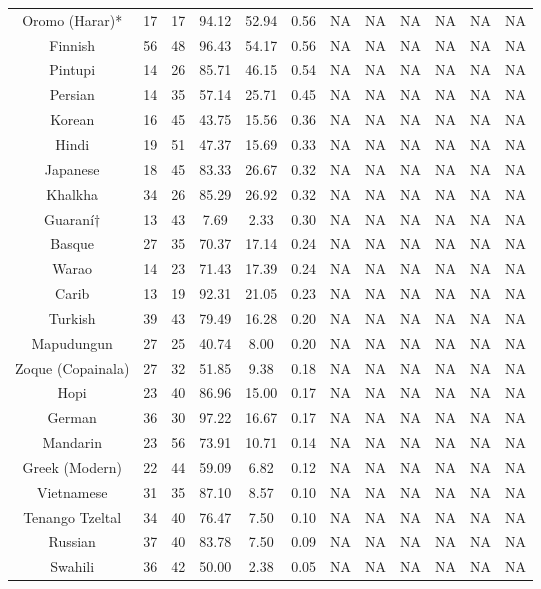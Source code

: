 \begin{tabular}{cccccccccccc}
Oromo (Harar)* & 17 & 17 & 94.12 & 52.94 & 0.56 & NA & NA & NA & NA & NA & NA \\
Finnish & 56 & 48 & 96.43 & 54.17 & 0.56 & NA & NA & NA & NA & NA & NA \\
Pintupi & 14 & 26 & 85.71 & 46.15 & 0.54 & NA & NA & NA & NA & NA & NA \\
Persian & 14 & 35 & 57.14 & 25.71 & 0.45 & NA & NA & NA & NA & NA & NA \\
Korean & 16 & 45 & 43.75 & 15.56 & 0.36 & NA & NA & NA & NA & NA & NA \\
Hindi & 19 & 51 & 47.37 & 15.69 & 0.33 & NA & NA & NA & NA & NA & NA \\
Japanese & 18 & 45 & 83.33 & 26.67 & 0.32 & NA & NA & NA & NA & NA & NA \\
Khalkha & 34 & 26 & 85.29 & 26.92 & 0.32 & NA & NA & NA & NA & NA & NA \\
Guaraní$\dagger$ & 13 & 43 & 7.69 & 2.33 & 0.30 & NA & NA & NA & NA & NA & NA \\
Basque & 27 & 35 & 70.37 & 17.14 & 0.24 & NA & NA & NA & NA & NA & NA \\
Warao & 14 & 23 & 71.43 & 17.39 & 0.24 & NA & NA & NA & NA & NA & NA \\
Carib & 13 & 19 & 92.31 & 21.05 & 0.23 & NA & NA & NA & NA & NA & NA \\
Turkish & 39 & 43 & 79.49 & 16.28 & 0.20 & NA & NA & NA & NA & NA & NA \\
Mapudungun & 27 & 25 & 40.74 & 8.00 & 0.20 & NA & NA & NA & NA & NA & NA \\
Zoque (Copainala) & 27 & 32 & 51.85 & 9.38 & 0.18 & NA & NA & NA & NA & NA & NA \\
Hopi & 23 & 40 & 86.96 & 15.00 & 0.17 & NA & NA & NA & NA & NA & NA \\
German & 36 & 30 & 97.22 & 16.67 & 0.17 & NA & NA & NA & NA & NA & NA \\
Mandarin & 23 & 56 & 73.91 & 10.71 & 0.14 & NA & NA & NA & NA & NA & NA \\
Greek (Modern) & 22 & 44 & 59.09 & 6.82 & 0.12 & NA & NA & NA & NA & NA & NA \\
Vietnamese & 31 & 35 & 87.10 & 8.57 & 0.10 & NA & NA & NA & NA & NA & NA \\
Tenango Tzeltal & 34 & 40 & 76.47 & 7.50 & 0.10 & NA & NA & NA & NA & NA & NA \\
Russian & 37 & 40 & 83.78 & 7.50 & 0.09 & NA & NA & NA & NA & NA & NA \\
Swahili & 36 & 42 & 50.00 & 2.38 & 0.05 & NA & NA & NA & NA & NA & NA \\

\end{tabular}
